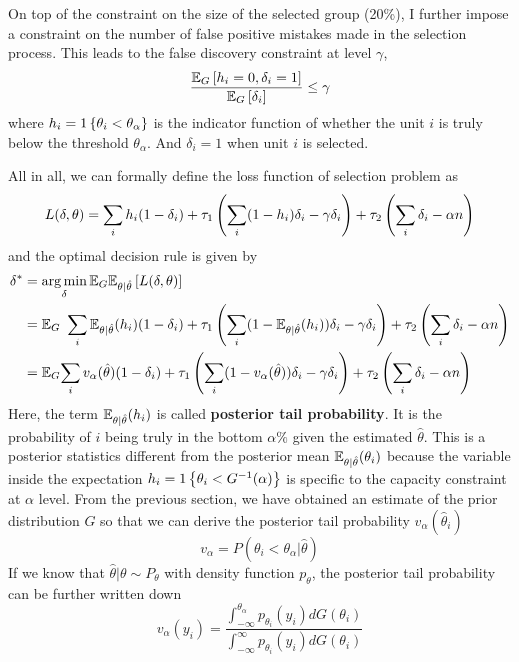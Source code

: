\documentclass[12pt]{article}
\begin{document}
On top of the constraint on the size of the selected group (20\%), I further
impose a constraint on the number of false positive mistakes made in the
selection process. This leads to the false discovery constraint at level
$\gamma$,
\begin{equation*}
    \frac{\mathbb{E}_G\left[h_i=0,\delta_i=1\right]}{\mathbb{E}_G\left[\delta_i\right]} \le \gamma
\end{equation*} where $h_i=1\left\{\theta_i<\theta_\alpha\right\}$ is the indicator function of whether the unit $i$ is truly below the threshold $\theta_\alpha$. And $\delta_i=1$ when unit $i$ is selected.

All in all, we can formally define the loss function of selection problem as
\begin{equation*}
    L(\delta,\theta)=\sum_i h_i(1-\delta_i) +\tau_1\left(\sum_i (1-h_i)\delta_i -\gamma \delta_i\right) + \tau_2 \left(\sum_i \delta_i -\alpha n\right)
\end{equation*}
and the optimal decision rule is given by
\begin{equation} \label{eq:decisionrule}
    \begin{split}
        \delta^* & =\operatorname*{arg\,min}_\delta \mathbb{E}_G\mathbb{E}_{\theta|\hat{\theta}}\left[L(\delta,\theta)\right]                                                                                                              \\
        & = \mathbb{E}_G \ \sum_i \mathbb{E}_{\theta|\hat{\theta}}(h_i)(1-\delta_i) +\tau_1\left(\sum_i (1-\mathbb{E}_{\theta|\hat{\theta}}(h_i))\delta_i -\gamma \delta_i\right) + \tau_2 \left(\sum_i \delta_i -\alpha n\right) \\
        & =\mathbb{E}_G{\sum_i v_\alpha(\hat{\theta})(1-\delta_i) +\tau_1\left(\sum_i (1-v_\alpha(\hat{\theta}))\delta_i -\gamma \delta_i\right) + \tau_2 \left(\sum_i \delta_i -\alpha n\right)}
    \end{split}
\end{equation}
Here, the term $\mathbb{E}_{\theta|\hat{\theta}}(h_i)$ is called \textbf{posterior tail probability}. It is the probability of $i$ being truly in the bottom $\alpha\%$ given the estimated $\hat{\theta}$.
This is a posterior statistics different from the posterior mean $\mathbb{E}_{\theta|\hat{\theta}}(\theta_i)$ because the variable inside the expectation $h_i=1\left\{\theta_i<G^{-1}(\alpha)\right\}$ is specific to the capacity constraint at $\alpha$ level.
From the previous section, we have obtained an estimate of the prior distribution $G$ so that we can derive the posterior tail probability $v_\alpha(\hat{\theta}_i)$
\begin{equation*}
    v_\alpha=P( \theta_i < \theta_{\alpha} |\hat{\theta})
\end{equation*}
If we know that $\hat{\theta}|\theta \sim P_\theta$ with density function $p_\theta$, the posterior tail probability can be further written down
\begin{equation*}
    v_\alpha(y_i)=\frac{{\int_{-\infty}^{\theta_{\alpha}} p_{\theta_i}(y_i) dG(\theta_i)}}
    {{\int_{-\infty}^{\infty} p_{\theta_i}(y_i) dG(\theta_i)}}
\end{equation*}
\end{document}
